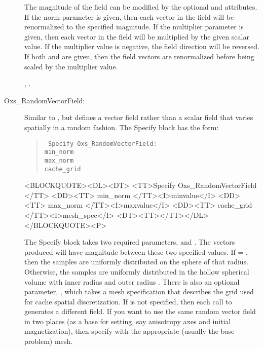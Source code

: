 \begin{description}
   The magnitude of the field can be modified by the optional
    and  attributes.  If the norm
   parameter is given, then each vector in the field will be
   renormalized to the specified magnitude.  If the multiplier parameter
   is given, then each vector in the field will be multiplied by the
   given scalar value.  If the multiplier value is negative, the field
   direction will be reversed.  If both  and 
   are given, then the field vectors are renormalized before being
   scaled by the multiplier value.

\begin{ExampleMifs}
  , .
\end{ExampleMifs}

%
\item[Oxs\_RandomVectorField:]
Similar to
%
, but defines a vector field rather than a scalar field that
varies spatially in a random fashion.  The Specify block has the form:
      \begin{latexonly}
      \begin{quote}\tt
      Specify Oxs\_RandomVectorField: \ocb\\
       \bi min\_norm \\
       \bi max\_norm \\
       \bi cache\_grid \\
      \ccb
      \end{quote}
      \end{latexonly}
      \begin{rawhtml}
      <BLOCKQUOTE><DL><DT>
      <TT>Specify Oxs_RandomVectorField {</TT>
      <DD><TT> min_norm </TT><I>minvalue</I>
      <DD><TT> max_norm </TT><I>maxvalue</I>
      <DD><TT> cache_grid </TT><I>mesh_spec</I>
      <DT><TT>}</TT></DL></BLOCKQUOTE><P>
      \end{rawhtml}
The Specify block takes two required parameters, 
and .  The vectors produced will have magnitude
between these two specified values.  If  = ,
then the samples are uniformly distributed on the sphere of that radius.
Otherwise, the samples are uniformly distributed in the hollow spherical
volume with inner radius  and outer radius .
There is also an optional parameter, , which takes
a mesh specification that describes the grid used for cache spatial
discretization.  If  is not specified, then each
call to  generates a different field.  If you
want to use the same random vector field in two places (as a base for
setting, say anisotropy axes and initial magnetization), then specify
 with the appropriate (usually the base problem)
mesh.


\end{description}
